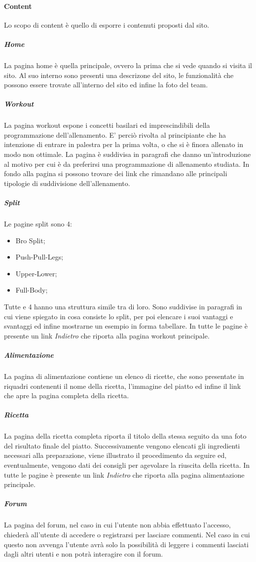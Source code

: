\paragraph{Content}
Lo scopo di content è quello di esporre i contenuti proposti dal sito.
\subparagraph{Home}
La pagina home è quella principale, ovvero la prima che si vede quando si visita il sito. Al suo interno sono presenti una descrizone del sito, le funzionalità che possono essere trovate all'interno del sito ed infine la foto del team.
\subparagraph{Workout}
La pagina workout espone i concetti basilari ed imprescindibili della programmazione dell'allenamento. E' perciò rivolta al principiante che ha intenzione di entrare in palestra per la prima volta, o che si è finora allenato in modo non ottimale.
La pagina è suddivisa in paragrafi che danno un'introduzione al motivo per cui è da preferirsi una programmazione di allenamento studiata.
In fondo alla pagina si possono trovare dei link che rimandano alle principali tipologie di suddivisione dell'allenamento.
\subparagraph{Split}
Le pagine split sono 4:
\begin{itemize}
\item Bro Split;
\item Push-Pull-Legs;
\item Upper-Lower;
\item Full-Body;
\end{itemize}           
Tutte e 4 hanno una struttura simile tra di loro.
Sono suddivise in paragrafi in cui viene spiegato in cosa consiste lo split, per poi elencare i suoi vantaggi e svantaggi ed infine mostrarne un esempio in forma tabellare.
In tutte le pagine è presente un link \textit{Indietro} che riporta alla pagina workout principale. 
\subparagraph{Alimentazione}
La pagina di alimentazione contiene un elenco di ricette, che sono presentate in riquadri contenenti il nome della ricetta, l’immagine
del piatto ed infine il link che apre la pagina completa della ricetta. 
\subparagraph{Ricetta}
La pagina della ricetta completa riporta il titolo della stessa seguito da una foto del risultato finale del piatto. Successivamente vengono elencati gli ingredienti necessari alla preparazione, viene illustrato il procedimento da seguire ed, eventualmente, vengono dati dei consigli per agevolare la riuscita della ricetta. In tutte le pagine è presente un link \textit{Indietro} che riporta alla pagina alimentazione principale.
\subparagraph{Forum}
La pagina del forum, nel caso in cui l'utente non abbia effettuato l'accesso, chiederà all'utente di accedere o registrarsi per lasciare commenti. Nel caso in cui questo non avvenga l'utente avrà solo la possibilità di leggere i commenti lasciati dagli altri utenti e non potrà interagire con il forum.
